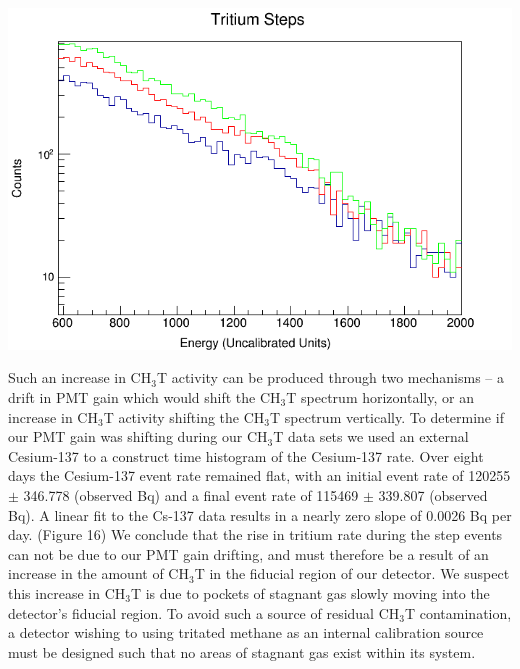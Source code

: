 \documentclass[a4paper,12pt]{article}
\begin{document}
\begin{center}
\includegraphics[scale=0.5]{Steps_Overlay.png}
\end{center}

Such an increase in CH$_3$T activity can be produced through two mechanisms -- a drift in PMT gain which would shift the CH$_3$T spectrum horizontally, or an increase in CH$_3$T activity shifting the CH$_3$T spectrum vertically.  To determine if our PMT gain was shifting during our CH$_3$T data sets we used an external Cesium-137 to a construct time histogram of the Cesium-137 rate.  Over eight days the Cesium-137 event rate remained flat, with an initial event rate of 120255 $\pm$ 346.778 (observed Bq) and a final event rate of 115469 $\pm$ 339.807 (observed Bq).  A linear fit to the Cs-137 data results in a nearly zero slope of 0.0026 Bq per day.  (Figure 16) We conclude that the rise in tritium rate during the step events can not be due to our PMT gain drifting, and must therefore be a result of an increase in the amount of CH$_3$T in the fiducial region of our detector.  We suspect this increase in CH$_3$T is due to pockets of stagnant gas slowly moving into the detector's fiducial region.  To avoid such a source of residual CH$_3$T contamination, a detector wishing to using tritated methane as an internal calibration source must be designed such that no areas of stagnant gas exist within its system.
\end{document}
